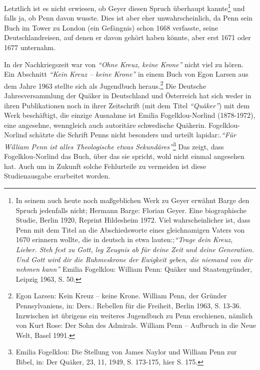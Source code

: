Letztlich ist es nicht erwiesen, ob Geyer diesen Spruch überhaupt
kannte\footnote{In seinem auch heute noch maßgeblichen Werk zu Geyer erwähnt
Barge den
Spruch jedenfalls nicht; Hermann Barge: Florian Geyer. Eine biographische
Studie, Berlin 1920, Reprint Hildesheim 1972. Viel wahrscheinlicher ist, dass
Penn mit dem Titel an die Abschiedsworte eines gleichnamigen Vaters von 1670
erinnern wollte, die in deutsch in etwa lauten:;\textit{"`Trage dein Kreuz, Lieber. Steh
fest zu Gott, leg Zeugnis ab für deine Zeit und deine Generation. Und Gott wird
dir die Ruhmeskrone der Ewigkeit geben, die niemand von dir nehmen kann"'}
Emilia Fogelklou: William Penn: Quäker und Staatengründer, Leipzig 1963, S. 50.}
und falls ja, ob Penn davon wusste. Dies ist aber eher unwahrscheinlich, da Penn
sein Buch im Tower zu London (ein Gefängnis) schon 1668 verfasste, seine Deutschlandreisen, auf
denen er davon gehört haben könnte, aber erst 1671 oder 1677 unternahm.

\medskip

In der Nachkriegszeit war von \textit{"`Ohne Kreuz, keine Krone"'} nicht viel zu hören.
Ein Abschnitt \textit{"`Kein Kreuz -- keine Krone"'} in einem Buch von Egon Larsen aus
dem Jahre 1963 stellte sich als Jugendbuch heraus.\footnote{Egon Larsen: Kein
Kreuz -- keine Krone. William Penn, der Gründer
Pennsylvaniens, in: Ders.: Rebellen für die Freiheit, Berlin 1963, S. 13-36.
Inzwischen ist übrigens ein weiteres Jugendbuch zu Penn erschienen, nämlich von
Kurt Rose: Der Sohn des Admirals. William Penn -- Aufbruch in die Neue Welt,
Basel 1991.} Die Deutsche
Jahresversammlung der Quäker in Deutschland und Österreich hat sich weder in
ihren Publikationen noch in ihrer Zeitschrift (mit dem Titel \textit{"`Quäker"'}) mit dem Werk beschäftigt,
die einzige Ausnahme ist Emilia Fogelklou-Norlind (1878-1972), eine angesehne,
wenngleich auch autoritäre schwedische Quäkerin. Fogelklou-Norlind schätzte die
Schrift Penns nicht besonders und urteilt lapidar:.\textit{"`Für William Penn ist alles
Theologische etwas Sekundäres"'}\footnote{Emilia Fogelklou: Die Stellung von
James Naylor und William Penn zur Bibel,
in: Der Quäker, 23, 11, 1949, S. 173-175, hier S. 175.} Das zeigt, dass
Fogelklou-Norlind das Buch, über das sie spricht, wohl nicht einmal angesehen
hat. Auch um in Zukunft solche Fehlurteile zu vermeiden ist diese Studienausgabe
erarbeitet worden.


